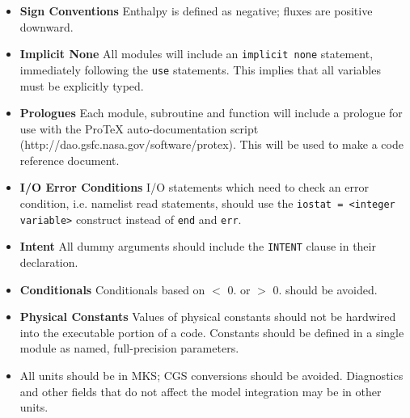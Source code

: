 \begin{itemize}
  \item {\bf Sign Conventions}  Enthalpy is defined as negative; fluxes
        are positive downward.

  \item {\bf Implicit None}  All modules will include an {\tt implicit none}
        statement, immediately following the {\tt use} statements.  This
        implies that all variables must be explicitly typed.

  \item {\bf Prologues}  Each module, subroutine and function will include
        a prologue for use with the ProTeX auto-documentation script
        (http://dao.gsfc.nasa.gov/software/protex).  This will be used
        to make a code reference document.
 
  \item {\bf I/O Error Conditions} I/O statements which need to check an
        error condition, i.e. namelist read statements, should use the 
        {\tt iostat = <integer variable>} construct instead of {\tt end} and
        {\tt err}.

  \item {\bf Intent} All dummy arguments should include the {\tt INTENT}
        clause in their declaration.

  \item {\bf Conditionals} Conditionals based on $<$ 0. or $>$ 0. should be avoided.

  \item {\bf Physical Constants} Values of physical constants should not be 
        hardwired into the executable portion of a code.  Constants should be
        defined in a single module as named, full-precision parameters.  
        
  \item All units should be in MKS; CGS conversions should be avoided.  
        Diagnostics and other fields that do not affect the model integration
        may be in other units.
\end{itemize}

